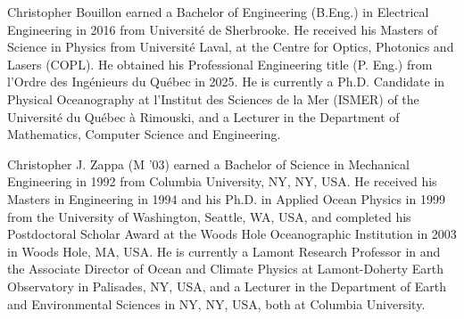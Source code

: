 \documentclass[letterpaper,journal]{IEEEtran}
\begin{document}
\begin{IEEEbiography}{Christopher Bouillon} earned a Bachelor of Engineering (B.Eng.) in Electrical Engineering in 2016 from Université de Sherbrooke. He received his Masters of Science in Physics from Université Laval, at the Centre for Optics, Photonics and Lasers (COPL). He obtained his Professional Engineering title (P. Eng.) from l'Ordre des Ingénieurs du Québec in 2025. He is currently a Ph.D. Candidate in Physical Oceanography at l'Institut des Sciences de la Mer (ISMER) of the Université du Québec à Rimouski, and a Lecturer in the Department of Mathematics, Computer Science and Engineering.
\end{IEEEbiography}

\begin{IEEEbiography}{Christopher J. Zappa}
(M '03) earned a Bachelor of Science in Mechanical Engineering in 1992 from Columbia University, NY, NY, USA.  He received his Masters in Engineering in 1994 and his Ph.D. in Applied Ocean Physics in 1999 from the University of Washington, Seattle, WA, USA, and completed his Postdoctoral Scholar Award at the Woods Hole Oceanographic Institution in 2003 in Woods Hole, MA, USA. He is currently a Lamont Research Professor in and the Associate Director of Ocean and Climate Physics at Lamont-Doherty Earth Observatory in Palisades, NY, USA, and a Lecturer in the Department of Earth and Environmental Sciences in NY, NY, USA, both at Columbia University.
\end{IEEEbiography}
\end{document}
